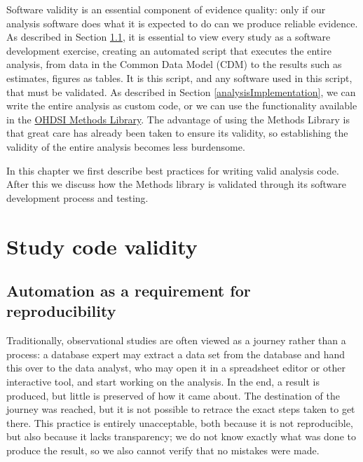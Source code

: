 \documentclass[11pt]{book}
\theoremstyle{definition}
\theoremstyle{definition}
\theoremstyle{definition}
\theoremstyle{remark}
\begin{document}
Software validity is an essential component of evidence quality: only if our analysis software does what it is expected to do can we produce reliable evidence. As described in Section \ref{automation}, it is essential to view every study as a software development exercise, creating an automated script that executes the entire analysis, from data in the Common Data Model (CDM) to the results such as estimates, figures as tables. It is this script, and any software used in this script, that must be validated. As described in Section \ref{analysisImplementation}, we can write the entire analysis as custom code, or we can use the functionality available in the \href{https://ohdsi.github.io/MethodsLibrary/}{OHDSI Methods Library}. The advantage of using the Methods Library is that great care has already been taken to ensure its validity, so establishing the validity of the entire analysis becomes less burdensome.  

In this chapter we first describe best practices for writing valid analysis code. After this we discuss how the Methods library is validated through its software development process and testing. 

\hypertarget{study-code-validity}{%
\section{Study code validity}\label{study-code-validity}}

\hypertarget{automation}{%
\subsection{Automation as a requirement for reproducibility}\label{automation}}

Traditionally, observational studies are often viewed as a journey rather than a process: a database expert may extract a data set from the database and hand this over to the data analyst, who may open it in a spreadsheet editor or other interactive tool, and start working on the analysis. In the end, a result is produced, but little is preserved of how it came about. The destination of the journey was reached, but it is not possible to retrace the exact steps taken to get there. This practice is entirely unacceptable, both because it is not reproducible, but also because it lacks transparency; we do not know exactly what was done to produce the result, so we also cannot verify that no mistakes were made. 
\end{document}
